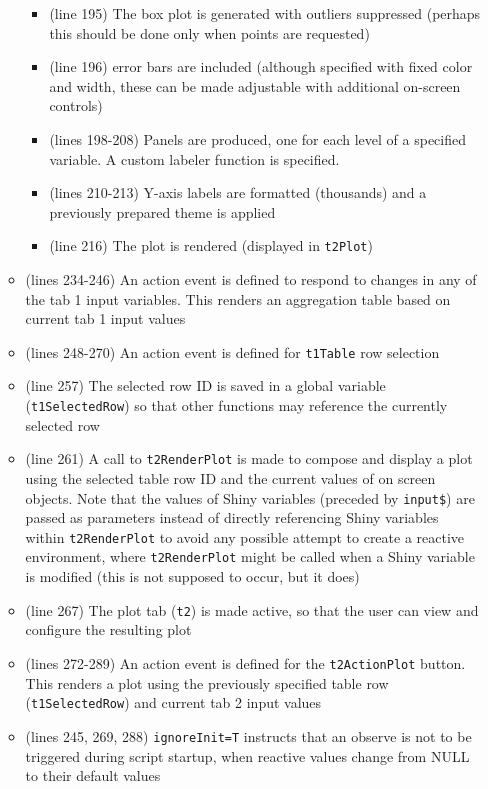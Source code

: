\documentclass[10pt, letterpaper]{article}
\begin{document}
\begin{spacing}{1.0}
\begin{itemize}
\begin{itemize}
\begin{itemize}
              \item (line 195) The box plot is generated with outliers suppressed (perhaps this should be done only when points are requested)
              \item (line 196) error bars are included (although specified with fixed color and width, these can be made adjustable with additional on-screen controls)
              \item (lines 198-208) Panels are produced, one for each level of a specified variable.  A custom labeler function is specified.
              \item (lines 210-213) Y-axis labels are formatted (thousands) and a previously prepared theme is applied
              \item (line 216) The plot is rendered (displayed in \texttt{t2Plot})
           \end{itemize}
            \item (lines 234-246) An action event is defined to respond to changes in any of the tab 1 input variables.  This renders an aggregation table based on current tab 1 input values
           \item (lines 248-270) An action event is defined for \texttt{t1Table} row selection
           \item (line 257) The selected row ID is saved in a global variable (\texttt{t1SelectedRow}) so that other functions may reference the currently selected row
           \item (line 261) A call to \texttt{t2RenderPlot} is made to compose and display a plot using the selected table row ID and the current values of on screen objects.  Note that the values of Shiny variables (preceded by \texttt{input\$}) are passed as parameters instead of directly referencing Shiny variables within \texttt{t2RenderPlot} to avoid any possible attempt to create a reactive environment,  where \texttt{t2RenderPlot} might be called when a Shiny variable is modified (this is not supposed to occur, but it does)
           \item (line 267) The plot tab (\texttt{t2}) is made active, so that the user can view and configure the resulting plot
           \item (lines 272-289) An action event is defined for the \texttt{t2ActionPlot} button.  This renders a plot using the previously specified table row (\texttt{t1SelectedRow}) and current tab 2 input values
           \item (lines 245, 269, 288) \texttt{ignoreInit=T} instructs that an observe is not to be triggered during script startup, when reactive values change from NULL to their default values 
      \end{itemize}


\end{itemize}
\end{spacing}
\end{document}
